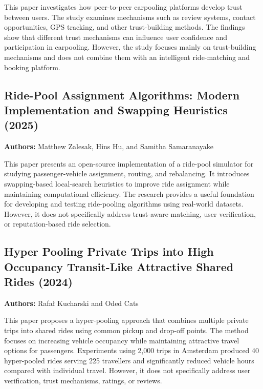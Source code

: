 \documentclass[12pt,a4paper,oneside]{report}
\begin{document}
This paper investigates how peer-to-peer carpooling platforms develop trust
between users. The study examines mechanisms such as review systems, contact
opportunities, GPS tracking, and other trust-building methods. The findings
show that different trust mechanisms can influence user confidence and
participation in carpooling. However, the study focuses mainly on
trust-building mechanisms and does not combine them with an intelligent
ride-matching and booking platform.
\\
\subsection{Ride-Pool Assignment Algorithms: Modern Implementation and Swapping Heuristics (2025)}
\textbf{Authors:} Matthew Zalesak, Hins Hu, and Samitha Samaranayake

This paper presents an open-source implementation of a ride-pool simulator for
studying passenger-vehicle assignment, routing, and rebalancing. It introduces
swapping-based local-search heuristics to improve ride assignment while
maintaining computational efficiency. The research provides a useful
foundation for developing and testing ride-pooling algorithms using real-world
datasets. However, it does not specifically address trust-aware matching, user
verification, or reputation-based ride selection.

\subsection{Hyper Pooling Private Trips into High Occupancy Transit-Like Attractive Shared Rides (2024)}
\textbf{Authors:} Rafa\l{} Kucharski and Oded Cats

This paper proposes a hyper-pooling approach that combines multiple private
trips into shared rides using common pickup and drop-off points. The method
focuses on increasing vehicle occupancy while maintaining attractive travel
options for passengers. Experiments using 2,000 trips in Amsterdam produced 40
hyper-pooled rides serving 225 travellers and significantly reduced vehicle
hours compared with individual travel. However, it does not specifically
address user verification, trust mechanisms, ratings, or reviews.

\vfill
\end{document}
